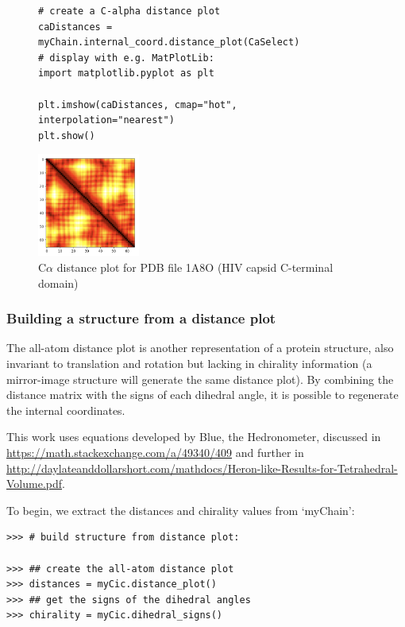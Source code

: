 \begin{figure}[h!]
\begin{verbatim}
# create a C-alpha distance plot
caDistances = myChain.internal_coord.distance_plot(CaSelect)
# display with e.g. MatPlotLib:
import matplotlib.pyplot as plt

plt.imshow(caDistances, cmap="hot", interpolation="nearest")
plt.show()
\end{verbatim}

\begin{htmlonly}
\end{htmlonly}
\begin{latexonly}
\includegraphics[width=0.3\textwidth]{images/1a8o-ca-plot.png}
\end{latexonly}
\caption{C$\alpha$ distance plot for PDB file 1A8O (HIV capsid C-terminal domain)}
\label{fig:distanceplot}
\end{figure}

\subsubsection{Building a structure from a distance plot}

The all-atom distance plot is another representation of a protein structure, also
invariant to translation and rotation but lacking in chirality information (a
mirror-image structure will generate the same distance plot).  By combining the
distance matrix with the signs of each dihedral angle, it is possible to regenerate
the internal coordinates.  

This work uses equations developed by Blue, the Hedronometer,
discussed in \url{https://math.stackexchange.com/a/49340/409} and further in 
\url{http://daylateanddollarshort.com/mathdocs/Heron-like-Results-for-Tetrahedral-Volume.pdf}.

To begin, we extract the distances and chirality values from `myChain':

\begin{verbatim}
>>> # build structure from distance plot:

>>> ## create the all-atom distance plot
>>> distances = myCic.distance_plot()
>>> ## get the signs of the dihedral angles
>>> chirality = myCic.dihedral_signs()
\end{verbatim}

